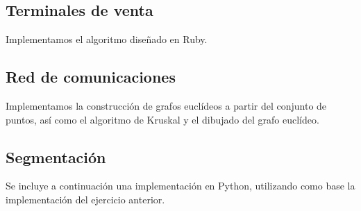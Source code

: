\documentclass[a4paper, 11pt]{article} %
\begin{document}
   \subsection{Terminales de venta}
      Implementamos el algoritmo diseñado en Ruby.
  
      \small
	\texttt{}
      \normalsize
   
   \subsection{Red de comunicaciones}
      Implementamos la construcción de grafos euclídeos a partir del conjunto de puntos, así como el algoritmo de Kruskal y
      el dibujado del grafo euclídeo.
      
      \small
	\texttt{}
      \normalsize
    
   \subsection{Segmentación}
      Se incluye a continuación una implementación en Python, utilizando como base la implementación del ejercicio anterior.\\
        \small
	\texttt{}
	\normalsize  
    
\end{document}
